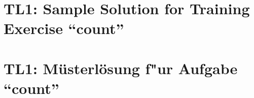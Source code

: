 
\ifenglish
\section*{TL1: Sample Solution for Training Exercise ``count''}

\fi
\ifgerman
\section*{TL1: M\"usterl\"osung f"ur Aufgabe ``count''}

\fi

